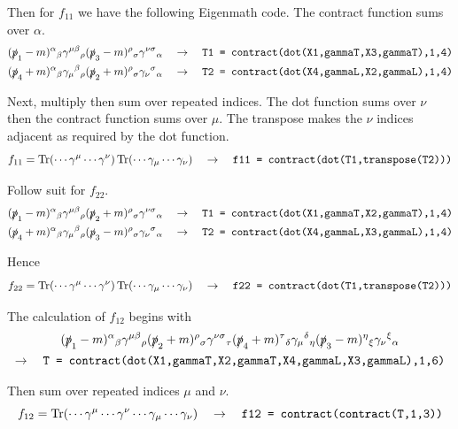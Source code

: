 \documentclass[12pt]{article}
\begin{document}
\noindent
Then for $f_{11}$ we have the following Eigenmath code.
The contract function sums over $\alpha$.
\begin{align*}
(\slashed{p}_1-m)^\alpha{}_\beta
\gamma^{\mu\beta}{}_\rho
(\slashed{p}_3-m)^\rho{}_\sigma
\gamma^{\nu\sigma}{}_\alpha
\quad&\rightarrow\quad
\text{\tt T1 = contract(dot(X1,gammaT,X3,gammaT),1,4)}\\
(\slashed{p}_4+m)^\alpha{}_\beta
\gamma_\mu{}^\beta{}_\rho
(\slashed{p}_2+m)^\rho{}_\sigma
\gamma_\nu{}^\sigma{}_\alpha
\quad&\rightarrow\quad
\text{\tt T2 = contract(dot(X4,gammaL,X2,gammaL),1,4)}
\end{align*}

\noindent
Next, multiply then sum over repeated indices.
The dot function sums over $\nu$ then the contract function
sums over $\mu$. The transpose makes the $\nu$ indices adjacent
as required by the dot function.
$$
f_{11}=
\mathop{\rm Tr}(\cdots\gamma^\mu\cdots\gamma^\nu)
\mathop{\rm Tr}(\cdots\gamma_\mu\cdots\gamma_\nu)
\quad\rightarrow\quad
\text{\tt f11 = contract(dot(T1,transpose(T2)))}
$$

\noindent
Follow suit for $f_{22}$.
\begin{align*}
(\slashed{p}_1-m)^\alpha{}_\beta
\gamma^{\mu\beta}{}_\rho
(\slashed{p}_2+m)^\rho{}_\sigma
\gamma^{\nu\sigma}{}_\alpha
\quad&\rightarrow\quad
\text{\tt T1 = contract(dot(X1,gammaT,X2,gammaT),1,4)}
\\
(\slashed{p}_4+m)^\alpha{}_\beta
\gamma_\mu{}^\beta{}_\rho
(\slashed{p}_3-m)^\rho{}_\sigma
\gamma_\nu{}^\sigma{}_\alpha
\quad&\rightarrow\quad
\text{\tt T2 = contract(dot(X4,gammaL,X3,gammaL),1,4)}
\end{align*}

\noindent
Hence
$$
f_{22}=
\mathop{\rm Tr}(\cdots\gamma^\mu\cdots\gamma^\nu)
\mathop{\rm Tr}(\cdots\gamma_\mu\cdots\gamma_\nu)
\quad\rightarrow\quad
\text{\tt f22 = contract(dot(T1,transpose(T2)))}
$$

\noindent
The calculation of $f_{12}$ begins with
\begin{multline*}
(\slashed{p}_1-m)^\alpha{}_\beta
\gamma^{\mu\beta}{}_\rho
(\slashed{p}_2+m)^\rho{}_\sigma
\gamma^{\nu\sigma}{}_\tau
(\slashed{p}_4+m)^\tau{}_\delta
\gamma_\mu{}^\delta{}_\eta
(\slashed{p}_3-m)^\eta{}_\xi
\gamma_\nu{}^\xi{}_\alpha
\\
\rightarrow\quad
\text{\tt T = contract(dot(X1,gammaT,X2,gammaT,X4,gammaL,X3,gammaL),1,6)}
\end{multline*}

\noindent
Then sum over repeated indices $\mu$ and $\nu$.
$$
f_{12}=\mathop{\rm Tr}(\cdots\gamma^\mu\cdots\gamma^\nu\cdots\gamma_\mu\cdots\gamma_\nu)
\quad\rightarrow\quad
\text{\tt f12 = contract(contract(T,1,3))}
$$
\end{document}
